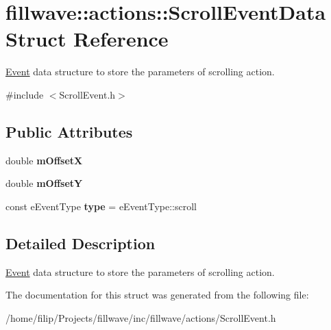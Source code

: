 \hypertarget{structfillwave_1_1actions_1_1ScrollEventData}{}\section{fillwave\+:\+:actions\+:\+:Scroll\+Event\+Data Struct Reference}
\label{structfillwave_1_1actions_1_1ScrollEventData}


\hyperlink{classfillwave_1_1actions_1_1Event}{Event} data structure to store the parameters of scrolling action.  




{\ttfamily \#include $<$Scroll\+Event.\+h$>$}

\subsection*{Public Attributes}
\begin{DoxyCompactItemize}
\item 
\hypertarget{structfillwave_1_1actions_1_1ScrollEventData_a030a9fbe9b5333be967d6ee753c21144}{}double {\bfseries m\+Offset\+X}\label{structfillwave_1_1actions_1_1ScrollEventData_a030a9fbe9b5333be967d6ee753c21144}

\item 
\hypertarget{structfillwave_1_1actions_1_1ScrollEventData_aa0658af7bb6ccda82a7cc5f2b13cc2a9}{}double {\bfseries m\+Offset\+Y}\label{structfillwave_1_1actions_1_1ScrollEventData_aa0658af7bb6ccda82a7cc5f2b13cc2a9}

\item 
\hypertarget{structfillwave_1_1actions_1_1ScrollEventData_a516948e3d06b3f743c114d131a9d0ebe}{}const e\+Event\+Type {\bfseries type} = e\+Event\+Type\+::scroll\label{structfillwave_1_1actions_1_1ScrollEventData_a516948e3d06b3f743c114d131a9d0ebe}

\end{DoxyCompactItemize}


\subsection{Detailed Description}
\hyperlink{classfillwave_1_1actions_1_1Event}{Event} data structure to store the parameters of scrolling action. 

The documentation for this struct was generated from the following file\+:\begin{DoxyCompactItemize}
\item 
/home/filip/\+Projects/fillwave/inc/fillwave/actions/Scroll\+Event.\+h\end{DoxyCompactItemize}
